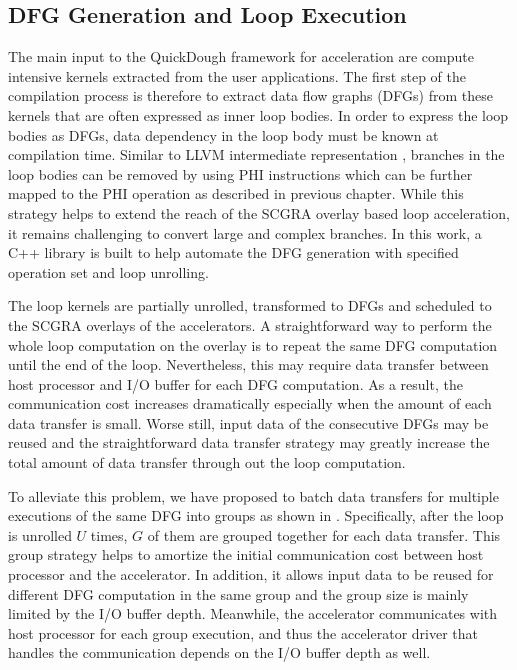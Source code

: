 \subsection{DFG Generation and Loop Execution}
The main input to the QuickDough framework for acceleration are compute intensive kernels extracted from the user applications. The first step of the compilation process is therefore to extract data flow graphs (DFGs) from these kernels that are often expressed as inner loop bodies. In order to express the loop bodies as DFGs, data dependency in the loop body must be known at compilation time. Similar to LLVM intermediate representation \cite{llvm}, branches in the loop bodies can be removed by using PHI instructions which can be further mapped to the PHI operation as described in previous chapter. While this strategy helps to extend the reach of the SCGRA overlay based loop acceleration, it remains challenging to convert large and complex branches. In this work, a C++ library is built to help automate the DFG generation with specified operation set and loop unrolling.

The loop kernels are partially unrolled, transformed to DFGs and scheduled to the SCGRA overlays of the accelerators. A straightforward way to perform the whole loop computation on the overlay is to repeat the same DFG computation until the end of the loop. Nevertheless, this may require data transfer between host processor and I/O buffer for each DFG computation. As a result, the communication cost increases dramatically especially when the amount of each data transfer is small. Worse still, input data of the consecutive DFGs may be reused and the straightforward data transfer strategy may greatly increase the total amount of data transfer through out the loop computation. 

To alleviate this problem, we have proposed to batch data transfers for multiple executions of the same DFG into groups as shown in . Specifically, after the loop is unrolled $U$ times, $G$ of them are grouped together for each data transfer. This group strategy helps to amortize the initial communication cost between host processor and the accelerator. In addition, it allows input data to be reused for different DFG computation in the same group and the group size is mainly limited by the I/O buffer depth. Meanwhile, the accelerator communicates with host processor for each group execution, and thus the accelerator driver that handles the communication depends on the I/O buffer depth as well. 

